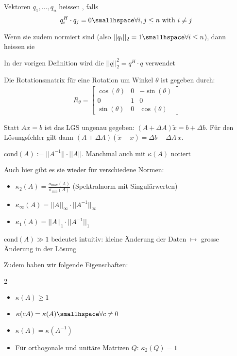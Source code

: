  Vektoren $q_1, \ldots, q_n$ heissen , falls
\rmvspace
\begin{align*}
    q_i^H \cdot q_j = 0 \smallhspace \forall i, j \leq n \text{ with } i \neq j
\end{align*}

\drmvspace
Wenn sie zudem normiert sind (also $||q_i||_2 = 1 \smallhspace \forall i \leq n$), dann heissen sie 

\inlineremark In der vorigen Definition wird die  $||q||_2^2 = q^H \cdot q$ verwendet

 Die Rotationsmatrix für eine Rotation um Winkel $\theta$ ist gegeben durch:
\rmvspace
\begin{align*}
    R_\theta =
    \begin{bmatrix}
        \cos(\theta) & 0 & -\sin(\theta) \\
        0            & 1 & 0             \\
        \sin(\theta) & 0 & \cos(\theta)
    \end{bmatrix}
\end{align*}


\drmvspace
{}

Statt $Ax = b$ ist das LGS ungenau gegeben: $(A + \Delta A)\tilde{x} = b + \Delta b$. Für den Lösungsfehler gilt dann $(A + \Delta A)(\tilde{x} - x) = \Delta b -\Delta A\,x$.

 $\text{cond}(A) := ||A^{-1}|| \cdot ||A||$. Manchmal auch mit $\kappa(A)$ notiert

Auch hier gibt es sie wieder für verschiedene Normen:
\begin{itemize}[noitemsep]
    \item $\kappa_2(A) = \frac{\sigma_\text{max} (A)}{\sigma_\text{min}(A)}$ (Spektralnorm mit Singulärwerten)
    \item $\kappa_\infty(A) = ||A||_\infty \cdot ||A^{-1}||_\infty$
    \item $\kappa_1(A) = ||A||_1 \cdot ||A^{-1}||_1$
\end{itemize}

$\text{cond}(A) \gg 1$ bedeutet intuitiv: kleine Änderung der Daten $\mapsto$ grosse Änderung in der Lösung

Zudem haben wir folgende Eigenschaften:
\drmvspace
\begin{multicols}{2}
    \begin{itemize}[noitemsep]
        \item $\kappa(A) \geq 1$
        \item $\kappa(cA) = \kappa(A) \smallhspace \forall c \neq 0$
        \item $\kappa(A) = \kappa(A^{-1})$
        \item Für orthogonale und unitäre Matrizen $Q$: $\kappa_2(Q) = 1$
    \end{itemize}
\end{multicols}



